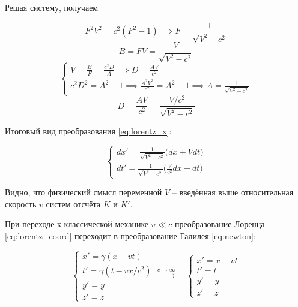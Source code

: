 \documentclass{article}
\begin{document}
Решая систему, получаем

\begin{equation*}
    F^2V^2=c^2\left(F^2-1\right) \implies F=\frac{1}{\sqrt{V^2-c^2}}
\end{equation*}
\begin{equation*}
    B=FV=\frac{V}{\sqrt{V^2-c^2}}
\end{equation*}
\begin{equation*}
    \begin{cases}
    V=\frac{B}{F}=\frac{c^2D}{A} \implies D=\frac{AV}{c^2}\\
    c^2D^2=A^2-1 \implies \frac{A^2V^2}{c^2}=A^2-1 \implies A=\frac{1}{\sqrt{V^2-c^2}}
    \end{cases}
\end{equation*}
\begin{equation*}
    D=\frac{AV}{c^2}=\frac{V/c^2}{\sqrt{V^2-c^2}}
\end{equation*}

Итоговый вид преобразования \eqref{eq:lorentz_x}:

\begin{equation*}
    \begin{cases}
    dx'=\frac{1}{\sqrt{V^2-c^2}}\big(dx+Vdt\big)\\
    dt'=\frac{1}{\sqrt{V^2-c^2}}\big(\frac{V}{c^2}dx+dt\big)
    \end{cases}
\end{equation*}

Видно, что физический смысл переменной $V$ -- введённая выше относительная скорость $v$ систем отсчёта $K$ и $K'$.

При переходе к классической механике $v\ll c$ преобразование Лоренца \eqref{eq:lorentz_coord} переходит в преобразование Галилея \eqref{eq:newton}:

\begin{equation*}
    \begin{cases}
    x'=\gamma\left(x-vt\right)\\
    t'=\gamma\left(t-vx/c^2\right)\\
    y'=y\\
    z'=z
    \end{cases}
    \xrightarrow{c\to\infty}\quad
    \begin{cases}
    x'=x-vt\\
    t'=t\\
    y'=y\\
    z'=z
    \end{cases}
\end{equation*}
\end{document}
